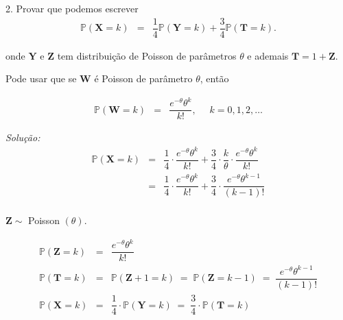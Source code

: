 \documentclass[a4paper, 11pt]{article}
\begin{document}
2. Provar que podemos escrever
\begin{equation*}
\begin{array}{lclll}
\mathds{P}(\mathbf{X} = k) & = & \dfrac{1}{4}\mathds{P}(\mathbf{Y} = k) + \dfrac{3}{4}\mathds{P}(\mathbf{T} = k).
\end{array}
\end{equation*}

onde $\mathbf{Y}$ e $\mathbf{Z}$ tem distribuição de Poisson de parâmetros $\theta$ e ademais $\mathbf{T} = 1 +\mathbf{Z}$.

Pode usar que se $\mathbf{W}$ é Poisson de parâmetro $\theta$, então

\begin{equation*}
\begin{array}{lclll}
\mathds{P}(\mathbf{W} = k) & = & \dfrac{e^{-\theta}\theta^{k}}{k!}, \; & \; k=0,1,2,\ldots
\end{array}
\end{equation*}

\noindent
\textit{Solução:} \\
\begin{equation*}
\begin{array}{lclll}
\mathds{P}(\mathbf{X} = k) & = & \dfrac{1}{4}\cdot\dfrac{e^{-\theta}\theta^{k}}{k!} + \dfrac{3}{4}\cdot\dfrac{k}{\theta}\cdot\dfrac{e^{-\theta}\theta^{k}}{k!} \\[10pt]

& = & \dfrac{1}{4}\cdot\dfrac{e^{-\theta}\theta^{k}}{k!} + \dfrac{3}{4}\cdot\dfrac{e^{-\theta}\theta^{k-1}}{(k-1)!} \\

\end{array}
\end{equation*}

$\mathbf{Z} \sim$ Poisson $(\theta)$.

\begin{equation*}
\begin{array}{lclll}
\mathds{P}(\mathbf{Z} = k) & = & \dfrac{e^{-\theta}\theta^{k}}{k!} \\[20pt]

\mathds{P}(\mathbf{T} = k) & = & \mathds{P}(\mathbf{Z} + 1 = k) \; = \; \mathds{P}(\mathbf{Z} = k - 1) \; = \; \dfrac{e^{-\theta}\theta^{k-1}}{(k-1)!} \\[20pt]

\mathds{P}(\mathbf{X} = k) & = & \dfrac{1}{4}\cdot\mathds{P}(\mathbf{Y} = k) \; = \; \dfrac{3}{4}\cdot\mathds{P}(\mathbf{T} = k) \\

\end{array}
\end{equation*}
\end{document}
